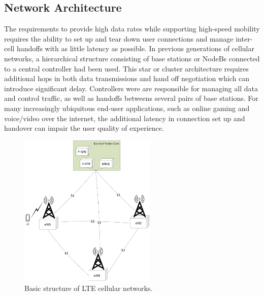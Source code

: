 \subsection{Network Architecture}
\label{net-arch}
The requirements to provide high data rates while supporting high-speed mobility requires the ability to set up and tear down user connections and manage inter-cell handoffs with as little latency as possible.  In previous generations of cellular networks, a hierarchical structure consisting of base stations or NodeBs connected to a central controller had been used.  This star or cluster architecture requires additional hops in both data transmissions and hand off negotiation which can introduce significant delay.  Controllers were are responsible for managing all data and control traffic, as well as handoffs betweens several pairs of base stations.  For many increasingly ubiquitous end-user applications, such as online gaming and voice/video over the internet, the additional latency in connection set up and handover can impair the user quality of experience.
\begin{figure}[!ht]
	\centering
	\includegraphics[width=0.58\textwidth]{figures3/lteAnet}
	\caption{Basic structure of LTE cellular networks.}
	\label{figs:LTE-A-Network}
\end{figure}


